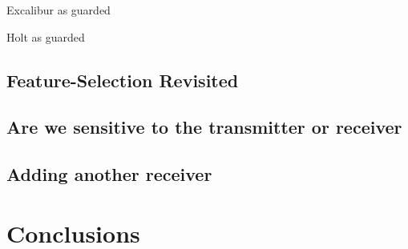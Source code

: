 \documentclass[conference]{IEEEtran}
\begin{document}
   Excalibur as guarded
 
   Holt as guarded
 
\subsection{Feature-Selection Revisited}

\subsection{Are we sensitive to the transmitter or receiver}

\subsection{Adding another receiver}


\section{Conclusions}


 
\end{document}
